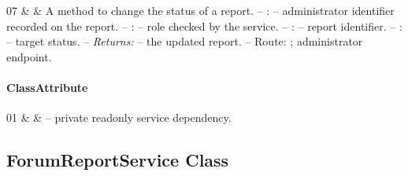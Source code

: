\begin{ClassMethodTable}
07 & \newline{}\newline{}\newline{} &
A method to change the status of a report.
\newline -- :  -- administrator identifier recorded on the report.
\newline -- :  -- role checked by the service.
\newline -- :  -- report identifier.
\newline -- :  -- target status.
\newline -- \textit{Returns:}  -- the updated report.
\newline -- Route: ; administrator endpoint. \\ \hline
\end{ClassMethodTable}

\paragraph{ClassAttribute}
\begin{ClassAttributeTable}
01 &  &  -- private readonly service dependency. \\ \hline
\end{ClassAttributeTable}

\subsection{ForumReportService Class}

